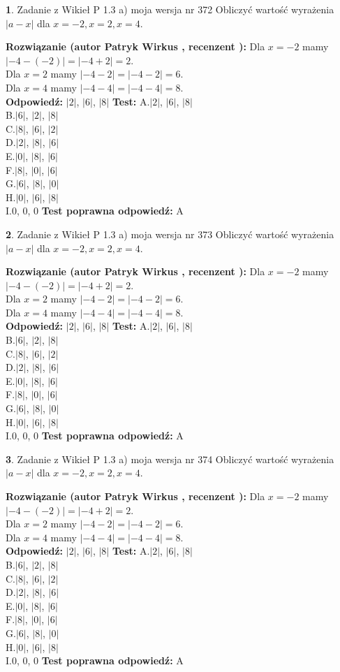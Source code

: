 \documentclass[12pt, a4paper]{article}
\theoremstyle{definition} %
\newtheorem{zad}{}
\newcommand{\zadStart}[1]{\begin{zad}#1\newline}
\newcommand{\zadStop}{\end{zad}}
\newcommand{\rozwStart}[2]{\noindent \textbf{Rozwiązanie (autor #1 , recenzent #2): }\newline}
\newcommand{\rozwStop}{\newline}
\newcommand{\odpStart}{\noindent \textbf{Odpowiedź:}\newline}
\newcommand{\odpStop}{\newline}
\newcommand{\testStart}{\noindent \textbf{Test:}\newline}
\newcommand{\testStop}{\newline}
\newcommand{\kluczStart}{\noindent \textbf{Test poprawna odpowiedź:}\newline}
\newcommand{\kluczStop}{\newline}
\begin{document}
\zadStart{Zadanie z Wikieł P 1.3 a) moja wersja nr 372}
Obliczyć wartość wyrażenia $|a - x|$ dla $x=-2,x=2,x=4$.
\zadStop
\rozwStart{Patryk Wirkus}{}
Dla $x = -2$ mamy $|-4 - (-2)| = |-4 + 2| = 2$.\\
Dla $x = 2$ mamy $|-4 - 2| = |-4 - 2| = 6$.\\
Dla $x = 4$ mamy $|-4 - 4| = |-4 - 4| = 8$.\\
\rozwStop
\odpStart
$|2|$, $|6|$, $|8|$
\odpStop
\testStart
A.$|2|$, $|6|$, $|8|$\\
B.$|6|$, $|2|$, $|8|$\\
C.$|8|$, $|6|$, $|2|$\\
D.$|2|$, $|8|$, $|6|$\\
E.$|0|$, $|8|$, $|6|$\\
F.$|8|$, $|0|$, $|6|$\\
G.$|6|$, $|8|$, $|0|$\\
H.$|0|$, $|6|$, $|8|$\\
I.$0$, $0$, $0$
\testStop
\kluczStart
A
\kluczStop



\zadStart{Zadanie z Wikieł P 1.3 a) moja wersja nr 373}
Obliczyć wartość wyrażenia $|a - x|$ dla $x=-2,x=2,x=4$.
\zadStop
\rozwStart{Patryk Wirkus}{}
Dla $x = -2$ mamy $|-4 - (-2)| = |-4 + 2| = 2$.\\
Dla $x = 2$ mamy $|-4 - 2| = |-4 - 2| = 6$.\\
Dla $x = 4$ mamy $|-4 - 4| = |-4 - 4| = 8$.\\
\rozwStop
\odpStart
$|2|$, $|6|$, $|8|$
\odpStop
\testStart
A.$|2|$, $|6|$, $|8|$\\
B.$|6|$, $|2|$, $|8|$\\
C.$|8|$, $|6|$, $|2|$\\
D.$|2|$, $|8|$, $|6|$\\
E.$|0|$, $|8|$, $|6|$\\
F.$|8|$, $|0|$, $|6|$\\
G.$|6|$, $|8|$, $|0|$\\
H.$|0|$, $|6|$, $|8|$\\
I.$0$, $0$, $0$
\testStop
\kluczStart
A
\kluczStop



\zadStart{Zadanie z Wikieł P 1.3 a) moja wersja nr 374}
Obliczyć wartość wyrażenia $|a - x|$ dla $x=-2,x=2,x=4$.
\zadStop
\rozwStart{Patryk Wirkus}{}
Dla $x = -2$ mamy $|-4 - (-2)| = |-4 + 2| = 2$.\\
Dla $x = 2$ mamy $|-4 - 2| = |-4 - 2| = 6$.\\
Dla $x = 4$ mamy $|-4 - 4| = |-4 - 4| = 8$.\\
\rozwStop
\odpStart
$|2|$, $|6|$, $|8|$
\odpStop
\testStart
A.$|2|$, $|6|$, $|8|$\\
B.$|6|$, $|2|$, $|8|$\\
C.$|8|$, $|6|$, $|2|$\\
D.$|2|$, $|8|$, $|6|$\\
E.$|0|$, $|8|$, $|6|$\\
F.$|8|$, $|0|$, $|6|$\\
G.$|6|$, $|8|$, $|0|$\\
H.$|0|$, $|6|$, $|8|$\\
I.$0$, $0$, $0$
\testStop
\kluczStart
A
\kluczStop
\end{document}
